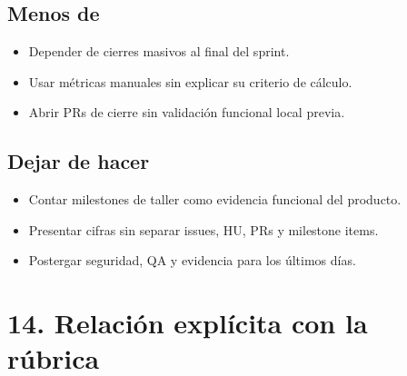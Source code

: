 \documentclass[11pt,a4paper]{article}
\begin{document}
\subsection{Menos de}

\begin{itemize}[leftmargin=1.5em]
\item Depender de cierres masivos al final del sprint.
\item Usar métricas manuales sin explicar su criterio de cálculo.
\item Abrir PRs de cierre sin validación funcional local previa.
\end{itemize}

\subsection{Dejar de hacer}

\begin{itemize}[leftmargin=1.5em]
\item Contar milestones de taller como evidencia funcional del producto.
\item Presentar cifras sin separar issues, HU, PRs y milestone items.
\item Postergar seguridad, QA y evidencia para los últimos días.
\end{itemize}

\section{14. Relación explícita con la rúbrica}
\end{document}
